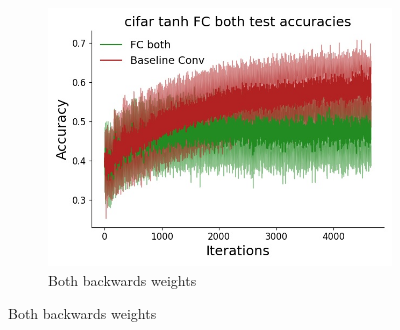 \begin{figure}[htb]
\begin{subfigure}{0.3\textwidth}
  \includegraphics[width=\linewidth]{chapter_6_figures/AR/cifar_tanh_FC_both_test_accuracies_prelim_1.jpg}
  \caption{Both backwards weights}
\end{subfigure}


\end{figure}
